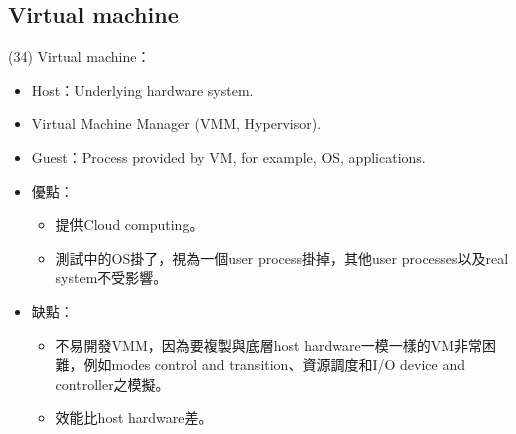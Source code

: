 \subsection{Virtual machine}

\begin{theorem}{(34)} Virtual machine：\begin{itemize}
        \item Host：Underlying hardware system.
        \item Virtual Machine Manager (VMM, Hypervisor).
        \item Guest：Process provided by VM, for example, OS, applications.
        \item 優點：\begin{itemize}
            \item 提供Cloud computing。
            \item 測試中的OS掛了，視為一個user process掛掉，其他user processes以及real system不受影響。
        \end{itemize}
        \item 缺點：\begin{itemize}
            \item 不易開發VMM，因為要複製與底層host hardware一模一樣的VM非常困難，例如modes control and transition、資源調度和I/O device and controller之模擬。
            \item 效能比host hardware差。
        \end{itemize}
    \end{itemize}
\end{theorem}

